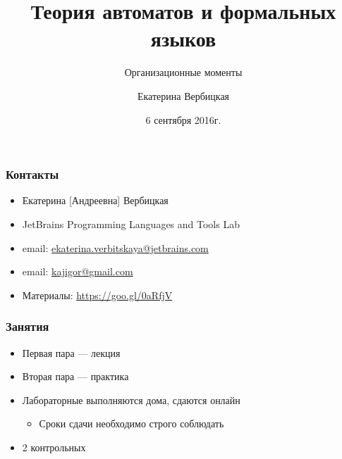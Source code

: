 \documentclass{beamer}
\title[]{Теория автоматов и формальных языков}
\subtitle[]{Организационные моменты}
\institute[]{
Санкт-Петербургский государственный электротехнический университет <<ЛЭТИ>>\\
}
\author[]{Екатерина Вербицкая}
\date{6 сентября 2016г.}
\begin{document}
{
\begin{frame}
  \titlepage
\end{frame}

}

\begin{frame}[fragile]
  \transwipe[direction=90]
  \frametitle{Контакты}
  \begin{itemize}
    \item Екатерина [Андреевна] Вербицкая
    \item JetBrains Programming Languages and Tools Lab 
    \item email: \href{mailto:ekaterina.verbitskaya@jetbrains.com}{ekaterina.verbitskaya@jetbrains.com} 
    \item email: \href{mailto:kajigor@gmail.com}{kajigor@gmail.com} 
    \item Материалы: \href{https://goo.gl/0aRfjV}{https://goo.gl/0aRfjV}
  \end{itemize}
\end{frame}

\begin{frame}[fragile]
  \transwipe[direction=90]
  \frametitle{Занятия}
  \begin{itemize}
    \item Первая пара --- лекция
    \item Вторая пара --- практика
    \item Лабораторные выполняются дома, сдаются онлайн
    \begin{itemize}
      \item Сроки сдачи необходимо строго соблюдать
    \end{itemize}
    \item 2 контрольных
  \end{itemize}
\end{frame}
\end{document}
